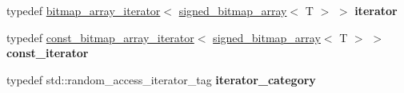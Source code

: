 \begin{DoxyCompactItemize}
typedef \hyperlink{classdialog_1_1bitmap__array__iterator}{bitmap\+\_\+array\+\_\+iterator}$<$ \hyperlink{classdialog_1_1signed__bitmap__array}{signed\+\_\+bitmap\+\_\+array}$<$ T $>$ $>$ {\bfseries iterator}
\item 
\mbox{\label{classdialog_1_1signed__bitmap__array_a7ef0ffd35b73a613a67d512279d29811}} 
typedef \hyperlink{classdialog_1_1const__bitmap__array__iterator}{const\+\_\+bitmap\+\_\+array\+\_\+iterator}$<$ \hyperlink{classdialog_1_1signed__bitmap__array}{signed\+\_\+bitmap\+\_\+array}$<$ T $>$ $>$ {\bfseries const\+\_\+iterator}
\item 
\mbox{\label{classdialog_1_1signed__bitmap__array_a2bc1a1dd92892e1ff97e15f88aa1c8a9}} 
typedef std\+::random\+\_\+access\+\_\+iterator\+\_\+tag {\bfseries iterator\+\_\+category}
\end{DoxyCompactItemize}
